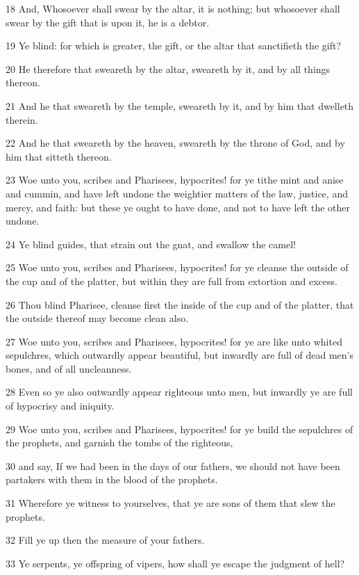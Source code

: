 \par 18 And, Whosoever shall swear by the altar, it is nothing; but whosoever shall swear by the gift that is upon it, he is a debtor.
\par 19 Ye blind: for which is greater, the gift, or the altar that sanctifieth the gift?
\par 20 He therefore that sweareth by the altar, sweareth by it, and by all things thereon.
\par 21 And he that sweareth by the temple, sweareth by it, and by him that dwelleth therein.
\par 22 And he that sweareth by the heaven, sweareth by the throne of God, and by him that sitteth thereon.
\par 23 Woe unto you, scribes and Pharisees, hypocrites! for ye tithe mint and anise and cummin, and have left undone the weightier matters of the law, justice, and mercy, and faith: but these ye ought to have done, and not to have left the other undone.
\par 24 Ye blind guides, that strain out the gnat, and swallow the camel!
\par 25 Woe unto you, scribes and Pharisees, hypocrites! for ye cleanse the outside of the cup and of the platter, but within they are full from extortion and excess.
\par 26 Thou blind Pharisee, cleanse first the inside of the cup and of the platter, that the outside thereof may become clean also.
\par 27 Woe unto you, scribes and Pharisees, hypocrites! for ye are like unto whited sepulchres, which outwardly appear beautiful, but inwardly are full of dead men's bones, and of all uncleanness.
\par 28 Even so ye also outwardly appear righteous unto men, but inwardly ye are full of hypocrisy and iniquity.
\par 29 Woe unto you, scribes and Pharisees, hypocrites! for ye build the sepulchres of the prophets, and garnish the tombs of the righteous,
\par 30 and say, If we had been in the days of our fathers, we should not have been partakers with them in the blood of the prophets.
\par 31 Wherefore ye witness to yourselves, that ye are sons of them that slew the prophets.
\par 32 Fill ye up then the measure of your fathers.
\par 33 Ye serpents, ye offspring of vipers, how shall ye escape the judgment of hell?
